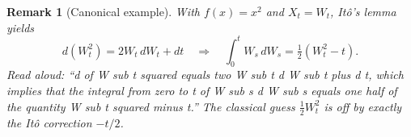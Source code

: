 \documentclass[11pt]{article}
\newtheorem{remark}[theorem]{Remark}
\begin{document}
\begin{remark}[Canonical example]
With $f(x) = x^2$ and $X_t = W_t$, It\^o's lemma yields
\[
d(W_t^2) = 2W_t\,dW_t + dt \quad\Longrightarrow\quad
\int_0^t W_s\,dW_s = \tfrac{1}{2}(W_t^2 - t).
\]
\emph{Read aloud:} ``d of W sub t squared equals two W sub t d W sub t plus d t, which implies that the integral from zero to t of W sub s d W sub s equals one half of the quantity W sub t squared minus t.''
The classical guess $\tfrac{1}{2}W_t^2$ is off by exactly the It\^o correction $-t/2$.
\end{remark}
\end{document}
